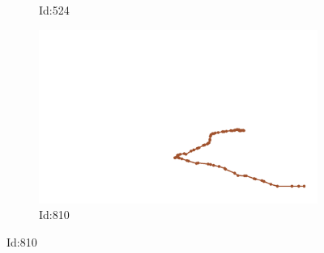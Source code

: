 \documentclass[12pt,twoside]{report}
\begin{document}
\begin{figure}
\begin{subfigure}[b]{0.20\textwidth}
\caption{Id:524}
\end{subfigure}
\begin{subfigure}[b]{0.20\textwidth}
\centering
\includegraphics[width=\textwidth]{../../trajectories/810.png}
\caption{Id:810}
\end{subfigure}
\end{figure}
\end{document}
